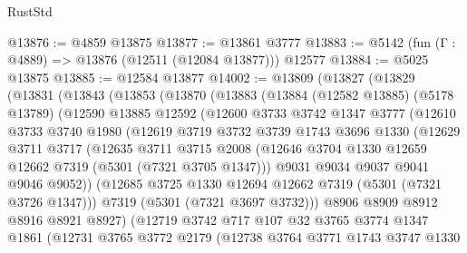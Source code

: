 \begin{lexlean}{RustStd}
\begin{coremodule}
@13876 := @4859 @13875
@13877 := @13861 @3777
@13883 := @5142 (fun (Γ : @4889) => @13876 (@12511 (@12084 @13877))) @12577
@13884 := @5025 @13875
@13885 := @12584 @13877
@14002 := @13809
    (@13827
      (@13829
        (@13831
          (@13843
            (@13853
              (@13870
                (@13883
                  (@13884
                    (@12582 @13885)
                    (@5178 @13789)
                    (@12590
                      @13885
                      @12592
                      (@12600
                        @3733
                        @3742
                        @1347
                        @3777
                        (@12610
                          @3733
                          @3740
                          @1980
                          (@12619
                            @3719
                            @3732
                            @3739
                            @1743
                            @3696
                            @1330
                            (@12629
                              @3711
                              @3717
                              (@12635
                                @3711
                                @3715
                                @2008
                                (@12646 @3704 @1330 @12659 @12662 @7319 (@5301 (@7321 @3705 @1347)))
                                @9031
                                @9034
                                @9037
                                @9041
                                @9046
                                @9052))
                            (@12685 @3725 @1330 @12694 @12662 @7319 (@5301 (@7321 @3726 @1347)))
                            @7319
                            (@5301 (@7321 @3697 @3732)))
                          @8906
                          @8909
                          @8912
                          @8916
                          @8921
                          @8927)
                        (@12719
                          @3742
                          @717
                          @107
                          @32
                          @3765
                          @3774
                          @1347
                          @1861
                          (@12731
                            @3765
                            @3772
                            @2179
                            (@12738
                              @3764
                              @3771
                              @1743
                              @3747
                              @1330

\end{coremodule}
\end{lexlean}
